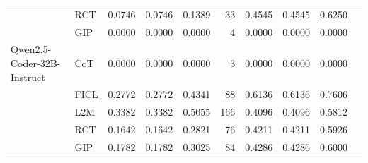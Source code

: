 \documentclass[conference]{IEEEtran}
\begin{document}
\begin{longtable}{p{3.5cm} l r r r r r r r r}
                    & RCT  & 0.0746 & 0.0746 & 0.1389 & 33 & 0.4545 & 0.4545 & 0.6250 \\
                    & GIP  & 0.0000 & 0.0000 & 0.0000 & 4 & 0.0000 & 0.0000 & 0.0000 \\ \addlinespace
Qwen2.5-Coder-32B-Instruct & CoT  & 0.0000 & 0.0000 & 0.0000 & 3 & 0.0000 & 0.0000 & 0.0000 \\
                           & FICL & 0.2772 & 0.2772 & 0.4341 & 88 & 0.6136 & 0.6136 & 0.7606 \\
                           & L2M  & 0.3382 & 0.3382 & 0.5055 & 166 & 0.4096 & 0.4096 & 0.5812 \\
                           & RCT  & 0.1642 & 0.1642 & 0.2821 & 76 & 0.4211 & 0.4211 & 0.5926 \\
                           & GIP  & 0.1782 & 0.1782 & 0.3025 & 84 & 0.4286 & 0.4286 & 0.6000 \\

  \bottomrule

\end{longtable}
\end{document}
